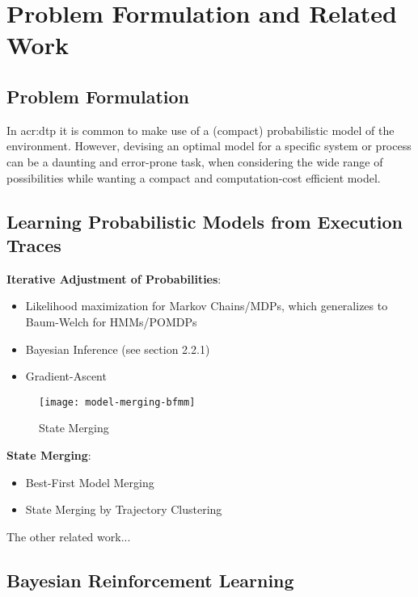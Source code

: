 \chapter{Problem Formulation and Related Work}
\label{ch:problem-related-work}

\section{Problem Formulation}
\label{ch:problem-formulation}

In \acrshort{acr:dtp} it is common to make use of a (compact) probabilistic model of the environment.
However, devising an optimal model for a specific system or process can be a daunting and error-prone task, when considering the wide range of possibilities while wanting a compact and computation-cost efficient model.

\section{Learning Probabilistic Models from Execution Traces}
\label{sec:learning-state-spaces}

\textbf{Iterative Adjustment of Probabilities}:
\begin{itemize}
	\item Likelihood maximization for Markov Chains/MDPs, which generalizes to Baum-Welch for HMMs/POMDPs
	\item Bayesian Inference (see section 2.2.1)
	\item Gradient-Ascent
\end{itemize}

\begin{figure}[]
	\centering
	\texttt{[image: model-merging-bfmm]}
	\caption{State Merging}
	\label{fig:state-merging}
\end{figure}

\noindent \textbf{State Merging}:
\begin{itemize}
	\item Best-First Model Merging \cite{stolcke1994best}
	\item State Merging by Trajectory Clustering \cite{nikovski2000learning}
\end{itemize}

\noindent The other related work...

\section{Bayesian Reinforcement Learning}
\label{sec:bayesian-reinforcement-learning}

